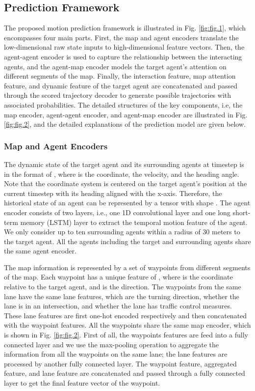 \documentclass[letterpaper, 10 pt, conference]{ieeeconf}
\begin{document}
\subsection{Prediction Framework}
The proposed motion prediction framework is illustrated in Fig. \ref{fig:fig.1}, which encompasses four main parts. First, the map and agent encoders translate the low-dimensional raw state inputs to high-dimensional feature vectors. Then, the agent-agent encoder is used to capture the relationship between the interacting agents, and the agent-map encoder models the target agent's attention on different segments of the map. Finally, the interaction feature, map attention feature, and dynamic feature of the target agent are concatenated and passed through the scored trajectory decoder to generate possible trajectories with associated probabilities. The detailed structures of the key components, i.e, the map encoder, agent-agent encoder, and agent-map encoder are illustrated in Fig. \ref{fig:fig.2}, and the detailed explanations of the prediction model are given below.

\subsubsection{Map and Agent Encoders} 
The dynamic state of the target agent and its surrounding agents  at timestep  is in the format of , where  is the coordinate,  the velocity, and  the heading angle. Note that the coordinate system is centered on the target agent's position at the current timestep with its heading aligned with the x-axis. Therefore, the historical state of an agent  can be represented by a tensor with shape . The agent encoder consists of two layers, i.e., one 1D convolutional layer and one long short-term memory (LSTM) layer to extract the temporal motion feature of the agent. We only consider up to ten surrounding agents within a radius of 30 meters to the target agent. All the agents including the target and surrounding agents share the same agent encoder.

The map information  is represented by a set of waypoints from different segments of the map. Each waypoint has a unique feature of , where  is the coordinate relative to the target agent, and  is the direction. The waypoints from the same lane have the same lane features, which are the turning direction, whether the lane is in an intersection, and whether the lane has traffic control measures. These lane features are first one-hot encoded respectively and then concatenated with the waypoint features. All the waypoints share the same map encoder, which is shown in Fig. \ref{fig:fig.2}. First of all, the waypoints features are feed into a fully connected layer and we use the max-pooling operation to aggregate the information from all the waypoints on the same lane; the lane features are processed by another fully connected layer. The waypoint feature, aggregated feature, and lane feature are concatenated and passed through a fully connected layer to get the final feature vector of the waypoint. 
\end{document}
